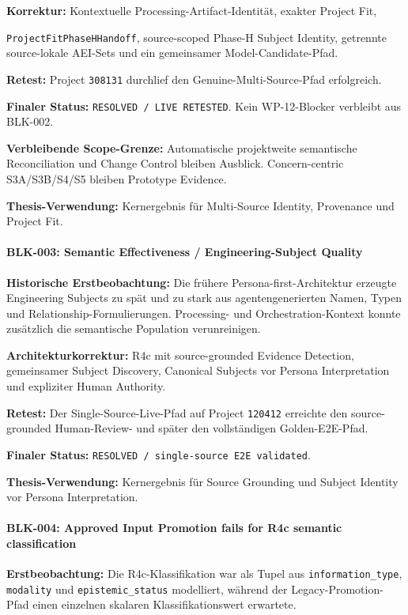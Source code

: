 \textbf{Korrektur:}
Kontextuelle Processing-Artifact-Identität, exakter Project Fit,

\noindent \texttt{ProjectFitPhaseHHandoff}, source-scoped Phase-H Subject Identity,
getrennte source-lokale AEI-Sets und ein gemeinsamer Model-Candidate-Pfad.

\textbf{Retest:}
Project \texttt{308131} durchlief den Genuine-Multi-Source-Pfad erfolgreich.

\textbf{Finaler Status:}
\texttt{RESOLVED / LIVE RETESTED}. Kein WP-12-Blocker verbleibt aus BLK-002.

\textbf{Verbleibende Scope-Grenze:}
Automatische projektweite semantische Reconciliation und Change Control bleiben
Ausblick. Concern-centric S3A/S3B/S4/S5 bleiben Prototype Evidence.

\textbf{Thesis-Verwendung:}
Kernergebnis für Multi-Source Identity, Provenance und Project Fit.


\paragraph{BLK-003: Semantic Effectiveness / Engineering-Subject Quality}

\textbf{Historische Erstbeobachtung:}
Die frühere Persona-first-Architektur erzeugte Engineering Subjects zu spät und
zu stark aus agentengenerierten Namen, Typen und Relationship-Formulierungen.
Processing- und Orchestration-Kontext konnte zusätzlich die semantische Population
verunreinigen.

\textbf{Architekturkorrektur:}
R4c mit source-grounded Evidence Detection, gemeinsamer Subject Discovery,
Canonical Subjects vor Persona Interpretation und expliziter Human Authority.

\textbf{Retest:}
Der Single-Source-Live-Pfad auf Project \texttt{120412} erreichte den
source-grounded Human-Review- und später den vollständigen Golden-E2E-Pfad.

\textbf{Finaler Status:}
\texttt{RESOLVED / single-source E2E validated}.

\textbf{Thesis-Verwendung:}
Kernergebnis für Source Grounding und Subject Identity vor Persona Interpretation.


\paragraph{BLK-004: Approved Input Promotion fails for R4c semantic classification}

\textbf{Erstbeobachtung:}
Die R4c-Klassifikation war als Tupel aus \texttt{information\_type},
\texttt{modality} und \texttt{epistemic\_status} modelliert, während der
Legacy-Promotion-Pfad einen einzelnen skalaren Klassifikationswert erwartete.

